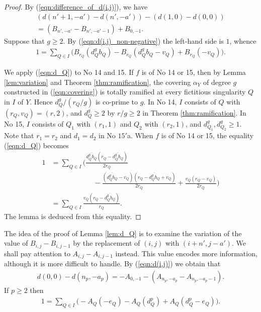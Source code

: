 \documentclass[a4paper,11pt]{amsart}
\theoremstyle{definition}
\theoremstyle{remark}
\numberwithin{equation}{section}
\begin{document}
\begin{proof}
By (\ref{eqn:difference_of_d(i,j)}),
we have
\begin{multline*}
(d(n'+1,-a')-d(n',-a'))-(d(1,0)-d(0,0)) \\
= (B_{n',-a'}-B_{n',-a'-1})+B_{0,-1}.
\end{multline*}
Suppose that $g\ge2$.
By (\ref{eqn:d(i,j)_non-negative}) the left-hand side is $1$,
whence
\begin{align}\label{eqn:d_Q}
1=\sum_{Q \in I}
\bigl(B_{r_Q}(d_Q^gb_Q)-B_{r_Q}(d_Q^gb_Q-v_Q)+B_{r_Q}(-v_Q)\bigr).
\end{align}

We apply (\ref{eqn:d_Q}) to No 14 and 15.
If $f$ is of No 14 or 15,
then by Lemma \ref{lem:variation} and Theorem \ref{thm:ramification},
the covering $\alpha_Y$ of degree $g$ constructed in (\ref{eqn:covering})
is totally ramified at every fictitious singularity $Q$ in $I$ of $Y$.
Hence $d_Q^g/(r_Q/g)$ is co-prime to $g$.
In No 14, $I$ consists of $Q$ with $(r_Q,v_Q)=(r,2)$,
and $d_Q^g \ge 2$ by $r/g \ge 2$ in Theorem \ref{thm:ramification}.
In No 15, $I$ consists of $Q_1$ with $(r_1,1)$ and $Q_2$ with $(r_2,1)$,
and $d_{Q_1}^g, d_{Q_2}^g \ge 1$.
Note that $r_1=r_2$ and $d_1=d_2$ in No $\textrm{15}'$a.
When $f$ is of No 14 or 15, the equality (\ref{eqn:d_Q}) becomes
\begin{align*}
1 &= \sum_{Q \in I}
\Biggl( \frac{\overline{d_Q^gb_Q}(r_Q-\overline{d_Q^gb_Q})}{2r_Q} \\
&\qquad \qquad \qquad
-\frac{(\overline{d_Q^gb_Q}-v_Q)(r_Q-\overline{d_Q^gb_Q}+v_Q)}{2r_Q}
+\frac{v_Q(r_Q-v_Q)}{2r_Q} \Biggr) \\
&= \sum_{Q \in I} \frac{v_Q(r_Q-\overline{d_Q^gb_Q})}{r_Q}.
\end{align*}
The lemma is deduced from this equality.
\end{proof}

The idea of the proof of Lemma \ref{lem:d_Q} is to examine
the variation of the value of $B_{i,j}-B_{i,j-1}$
by the replacement of $(i,j)$ with $(i+n',j-a')$.
We shall pay attention to $A_{i,j}-A_{i,j-1}$ instead.
This value encodes more information,
although it is more difficult to handle.
By (\ref{eqn:d(i,j)}) we obtain that
\begin{align*}
d(0,0)-d(n_p,-a_p)=-A_{0,-1}-(A_{n_p,-a_p}-A_{n_p,-a_p-1}).
\end{align*}
If $p\ge2$ then
\begin{align}\label{eqn:d_Q_again}
1=\sum_{Q \in I}
\bigl(-A_Q(-e_Q)-A_Q(d_Q^p)+A_Q(d_Q^p-e_Q)\bigr).
\end{align}
\end{document}
